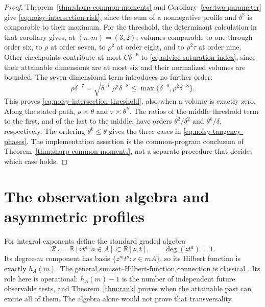 \documentclass[11pt]{amsart}
\theoremstyle{definition}\newtheorem{definition}[theorem]{Definition}
\theoremstyle{remark}\newtheorem{remark}[theorem]{Remark}
\newcommand{\R}{\mathbb R}\newcommand{\N}{\mathbb N}\newcommand{\C}{\mathbb C}
\begin{document}
\begin{proof}
Theorem~\ref{thm:sharp-common-moments} and
Corollary~\ref{cor:two-parameter} give
\eqref{eq:noisy-intersection-risk}, since the sum of a nonnegative
profile and $\delta^2$ is comparable to their maximum.
For the threshold, the determinant calculation in that corollary gives,
at $(n,m)=(3,2)$, volumes comparable to one through order six, to
$\rho$ at order seven, to $\rho^2$ at order eight, and to
$\rho^2\tau$ at order nine. Other checkpoints contribute at most
$C\delta^{-6}$ to \eqref{eq:advice-saturation-index}, since their
attainable dimensions are at most six and their normalized volumes are
bounded. The seven-dimensional term introduces no further order:
\[
 \rho\delta^{-7}
   =\sqrt{\delta^{-6}\,\rho^2\delta^{-8}}
   \le\max\{\delta^{-6},\rho^2\delta^{-8}\}.
\]
This proves \eqref{eq:noisy-intersection-threshold}, also when a volume
is exactly zero. Along the stated path, $\rho\asymp\theta$ and
$\tau\asymp\theta^k$. The ratios of the middle threshold term to
the first, and of the last to the middle, have orders
$\theta^2/\delta^2$ and $\theta^k/\delta$, respectively.
The ordering $\theta^k\le\theta$ gives the three cases in
\eqref{eq:noisy-tangency-phases}. The implementation assertion is the
common-program conclusion of Theorem~\ref{thm:sharp-common-moments},
not a separate procedure that decides which case holds.
\end{proof}

\appendix
\section{The observation algebra and asymmetric profiles}\label{sec:algebra}
For integral exponents define the standard graded algebra
\[
 \mathcal R_A=\R[z t^a:a\in A]\subset\R[z,t],\qquad \deg(zt^a)=1.
\]
Its degree-$m$ component has basis $\{z^m t^s:s\in mA\}$, so its
Hilbert function is exactly $h_A(m)$. The general sumset--Hilbert-function
connection is classical \cite{EliahouMazumdar,Elias}. Its role here is
operational: $h_A(m)-1$ is the number of independent future observable
tests, and Theorem~\ref{thm:rank} proves when the attainable past can
excite all of them. The algebra alone would not prove that transversality.
\end{document}
